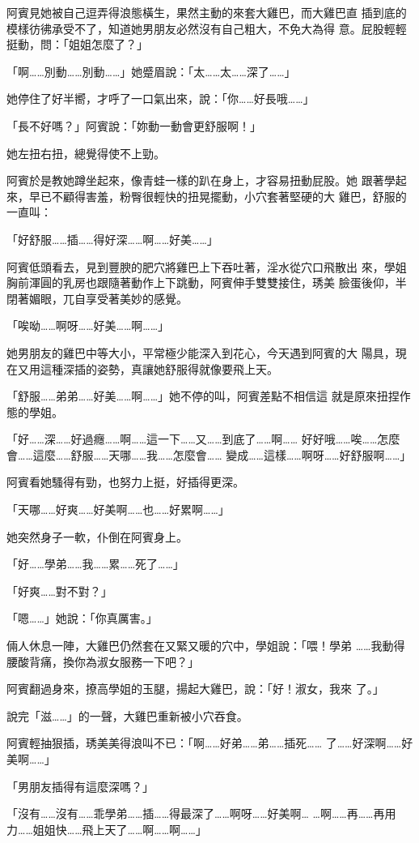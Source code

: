 阿賓見她被自己逗弄得浪態橫生，果然主動的來套大雞巴，而大雞巴直
插到底的模樣彷彿承受不了，知道她男朋友必然沒有自己粗大，不免大為得
意。屁股輕輕挺動，問：「姐姐怎麼了？」

「啊……別動……別動……」她蹙眉說：「太……太……深了……」

她停住了好半嚮，才呼了一口氣出來，說：「你……好長哦……」

「長不好嗎？」阿賓說：「妳動一動會更舒服啊！」

她左扭右扭，總覺得使不上勁。

阿賓於是教她蹲坐起來，像青蛙一樣的趴在身上，才容易扭動屁股。她
跟著學起來，早已不顧得害羞，粉臀很輕快的扭晃擺動，小穴套著堅硬的大
雞巴，舒服的一直叫：

「好舒服……插……得好深……啊……好美……」

阿賓低頭看去，見到豐腴的肥穴將雞巴上下吞吐著，淫水從穴口飛散出
來，學姐胸前渾圓的乳房也跟隨著動作上下跳動，阿賓伸手雙雙接住，琇美
臉蛋後仰，半閉著媚眼，兀自享受著美妙的感覺。

「唉呦……啊呀……好美……啊……」

她男朋友的雞巴中等大小，平常極少能深入到花心，今天遇到阿賓的大
陽具，現在又用這種深插的姿勢，真讓她舒服得就像要飛上天。

「舒服……弟弟……好美……啊……」她不停的叫，阿賓差點不相信這
就是原來扭捏作態的學姐。

「好……深……好過癮……啊……這一下……又……到底了……啊……
好好哦……唉……怎麼會……這麼……舒服……天哪……我……怎麼會……
變成……這樣……啊呀……好舒服啊……」

阿賓看她騷得有勁，也努力上挺，好插得更深。

「天哪……好爽……好美啊……也……好累啊……」

她突然身子一軟，仆倒在阿賓身上。

「好……學弟……我……累……死了……」

「好爽……對不對？」

「嗯……」她說：「你真厲害。」

倆人休息一陣，大雞巴仍然套在又緊又暖的穴中，學姐說：「喂！學弟
……我動得腰酸背痛，換你為淑女服務一下吧？」

阿賓翻過身來，撩高學姐的玉腿，揚起大雞巴，說：「好！淑女，我來
了。」

說完「滋……」的一聲，大雞巴重新被小穴吞食。

阿賓輕抽狠插，琇美美得浪叫不已：「啊……好弟……弟……插死……
了……好深啊……好美啊……」

「男朋友插得有這麼深嗎？」

「沒有……沒有……乖學弟……插……得最深了……啊呀……好美啊…
…啊……再……再用力……姐姐快……飛上天了……啊……啊……」


